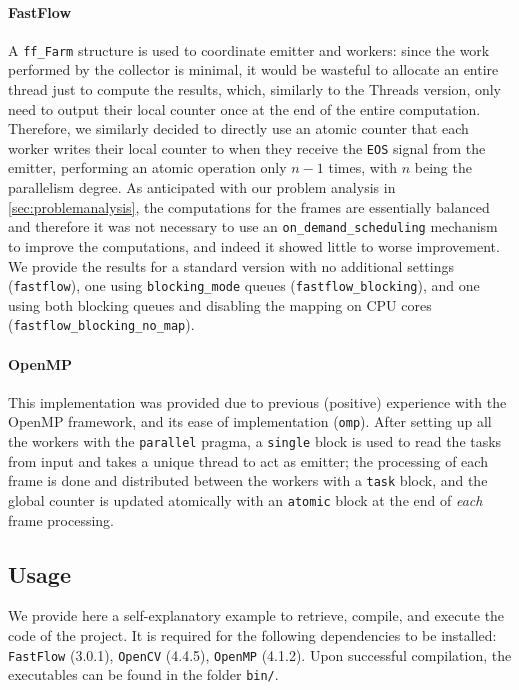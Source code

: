 \documentclass{article}
\begin{document}
\paragraph{\textsf{FastFlow}} A \texttt{ff\_Farm} structure is used to coordinate emitter and workers: since the work performed by the collector is minimal, it would be wasteful to allocate an entire thread just to compute the results, which, similarly to the \textsf{Threads} version, only need to output their local counter once at the end of the entire computation. Therefore, we similarly decided to directly use an atomic counter that each worker writes their local counter to when they receive the \texttt{EOS} signal from the emitter, performing an atomic operation only $n-1$ times, with $n$ being the parallelism degree. As anticipated with our problem analysis in \autoref{sec:problemanalysis}, the computations for the frames are essentially balanced and therefore it was not necessary to use an \texttt{on\_demand\_scheduling} mechanism to improve the computations, and indeed it showed little to worse improvement. We provide the results for a standard version with no additional settings (\texttt{fastflow}), one using \texttt{blocking\_mode} queues (\texttt{fastflow\_blocking}), and one using both blocking queues and disabling the mapping on CPU cores (\texttt{fastflow\_blocking\_no\_map}).

\paragraph{\textsf{OpenMP}} This implementation was provided due to previous (positive) experience with the OpenMP framework, and its ease of implementation (\texttt{omp}). After setting up all the workers with the \texttt{parallel} pragma, a \texttt{single} block is used to read the tasks from input and takes a unique thread to act as emitter; the processing of each frame is done and distributed between the workers with a \texttt{task} block, and the global counter is updated atomically with an \texttt{atomic} block at the end of \emph{each} frame processing.


\subsection{Usage}

We provide here a self-explanatory example to retrieve, compile, and execute the code of the project. It is required for the following dependencies to be installed: \texttt{FastFlow} (3.0.1), \texttt{OpenCV} (4.4.5), \texttt{OpenMP} (4.1.2). Upon successful compilation, the executables can be found in the folder \texttt{\textcolor{pisa}{bin/}}.
\end{document}
